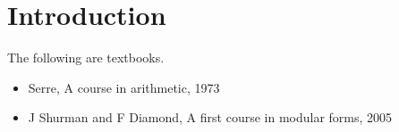 

\newcommand{\twobytwosmall}[4]{
  \begin{psmallmatrix}
    #1 & #2 \\
    #3 & #4
  \end{psmallmatrix}
}





\section{Introduction}


The following are textbooks.
\begin{itemize}
\item Serre, A course in arithmetic, 1973
\item J Shurman and F Diamond, A first course in modular forms, 2005
\end{itemize}

